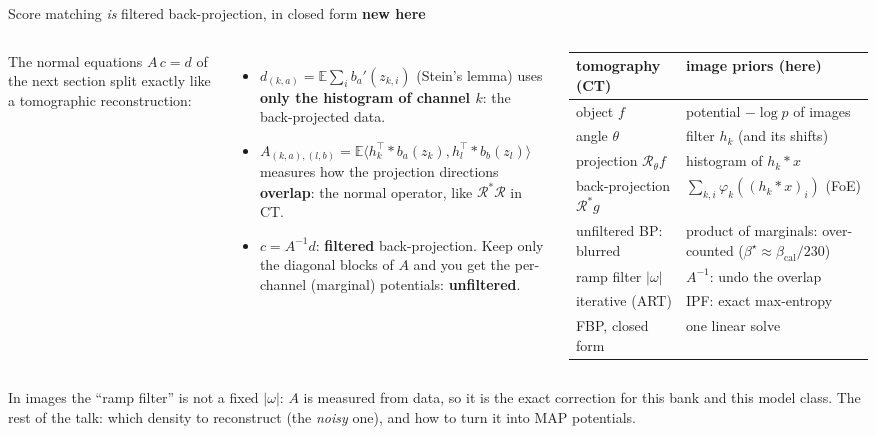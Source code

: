 \documentclass[10pt,aspectratio=169]{beamer}
\newcommand{\E}{\mathbb{E}}
\newcommand{\inner}[2]{\langle #1,#2\rangle}
\newcommand{\bcal}{\beta_{\mathrm{cal}}}
\newcommand{\tagnew}{\colorbox{wine!12}{\scriptsize\textcolor{wine}{\textbf{new here}}}}
\begin{document}
\begin{frame}{Score matching \emph{is} filtered back-projection, in closed form \hfill\tagnew}
\begin{columns}[T]
\small
The normal equations $A\,c=d$ of the next section split exactly like a tomographic
reconstruction:
\begin{itemize}\small
\item $d_{(k,a)}=\E\sum_i b_a'(z_{k,i})$ (Stein's lemma) uses \textbf{only the histogram of
      channel $k$}: the back-projected data.
\item $A_{(k,a),(l,b)}=\E\inner{h_k^\top*b_a(z_k)}{h_l^\top*b_b(z_l)}$ measures how the projection
      directions \textbf{overlap}: the normal operator, like $\mathcal R^*\mathcal R$ in CT.
\item $c=A^{-1}d$: \textbf{filtered} back-projection. Keep only the diagonal blocks of $A$ and
      you get the per-channel (marginal) potentials: \textbf{unfiltered}.
\end{itemize}
\footnotesize
\renewcommand{\arraystretch}{1.12}
\begin{tabular}{@{}>{\raggedright\arraybackslash}p{2.5cm}>{\raggedright\arraybackslash}p{3.5cm}@{}}
\toprule
tomography (CT) & image priors (here)\\\midrule
object $f$ & potential $-\log p$ of images\\
angle $\theta$ & filter $h_k$ (and its shifts)\\
projection $\mathcal R_\theta f$ & histogram of $h_k*x$\\
back-projection $\mathcal R^*g$ & $\sum_{k,i}\varphi_k((h_k*x)_i)$ (FoE)\\
unfiltered BP: blurred & product of marginals: over-counted ($\beta^\star\approx\bcal/230$)\\
ramp filter $|\omega|$ & $A^{-1}$: undo the overlap\\
iterative (ART) & IPF: exact max-entropy\\
FBP, closed form & one linear solve\\
\bottomrule
\end{tabular}
\end{columns}

\medskip
\begin{keybox}
\small In images the ``ramp filter'' is not a fixed $|\omega|$: $A$ is measured from data, so it is the
exact correction for this bank and this model class. The rest of the talk: which density to
reconstruct (the \emph{noisy} one), and how to turn it into MAP potentials.
\end{keybox}
\end{frame}
\end{document}

